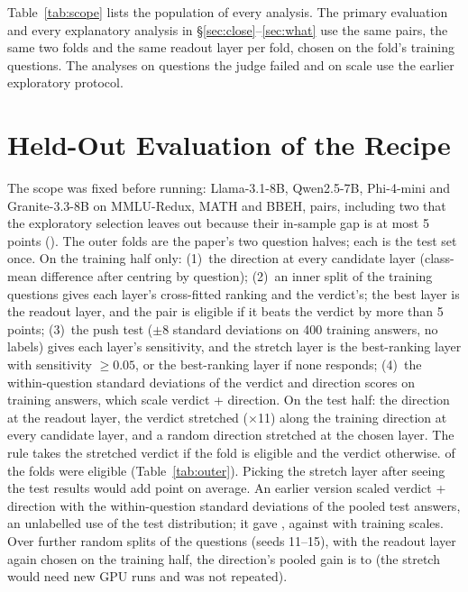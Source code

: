 Table~\ref{tab:scope} lists the population of every analysis. The primary evaluation and every explanatory analysis in \S\ref{sec:close}--\ref{sec:what} use the same  pairs, the same two folds and the same readout layer per fold, chosen on the fold's training questions. The analyses on questions the judge failed and on scale use the earlier exploratory protocol.

\section{Held-Out Evaluation of the Recipe}
\label{app:outer}

The scope was fixed before running: Llama-3.1-8B, Qwen2.5-7B, Phi-4-mini and Granite-3.3-8B on MMLU-Redux, MATH and BBEH,  pairs, including two that the exploratory selection leaves out because their in-sample gap is at most 5 points (). The outer folds are the paper's two question halves; each is the test set once. On the training half only: (1)~the direction at every candidate layer (class-mean difference after centring by question); (2)~an inner split of the training questions gives each layer's cross-fitted ranking and the verdict's; the best layer is the readout layer, and the pair is eligible if it beats the verdict by more than 5 points; (3)~the push test ($\pm$8 standard deviations on 400 training answers, no labels) gives each layer's sensitivity, and the stretch layer is the best-ranking layer with sensitivity $\ge 0.05$, or the best-ranking layer if none responds; (4)~the within-question standard deviations of the verdict and direction scores on training answers, which scale verdict + direction. On the test half: the direction at the readout layer, the verdict stretched ($\times$11) along the training direction at every candidate layer, and a random direction stretched at the chosen layer. The rule takes the stretched verdict if the fold is eligible and the verdict otherwise.  of the  folds were eligible (Table~\ref{tab:outer}). Picking the stretch layer after seeing the test results would add  point on average. An earlier version scaled verdict + direction with the within-question standard deviations of the pooled test answers, an unlabelled use of the test distribution; it gave , against  with training scales. Over  further random splits of the questions (seeds 11--15), with the readout layer again chosen on the training half, the direction's pooled gain is  to  (the stretch would need new GPU runs and was not repeated).

